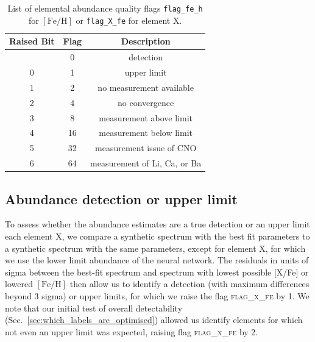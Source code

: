 \documentclass[
  journal=pasa,
  manuscript=research-paper, %
  year=2024,
  volume=37
]{cup-journal}
\newcommand{\feh}{$\mathrm{[Fe/H]}$\xspace}
\begin{document}
\begin{table}
\centering
\caption{List of elemental abundance quality flags \texttt{flag\_fe\_h} for \feh or \texttt{flag\_X\_fe} for element X.}
\label{tab:flag_x_fe}
\begin{tabular}{ccc}
\hline \hline
Raised Bit & Flag & Description \\
\hline
  & 0 & detection \\ 
0 & 1 & upper limit \\ 
1 & 2 & no measurement available\\
2 & 4 & no convergence\\
3 & 8 & measurement above limit\\
4 & 16 & measurement below limit\\
5 & 32 & measurement issue of CNO \\
6 & 64 & measurement of Li, Ca, or Ba \\ %
\hline
\end{tabular}
\end{table}

\subsection{Abundance detection or upper limit}
\label{sec:abundance_detection_or_upper_limit}

To assess whether the abundance estimates are a true detection or an upper limit each element X, we compare a synthetic spectrum with the best fit parameters to a synthetic spectrum with the same parameters, except for element X, for which we use the lower limit abundance of the neural network. The residuals in units of sigma between the best-fit spectrum and spectrum with lowest possible [X/Fe] or lowered \feh then allow us to identify a detection (with maximum differences beyond 3 sigma) or upper limits, for which we raise the flag \textsc{flag\_x\_fe} by 1. We note that our initial test of overall detectability (Sec.~\ref{sec:which_labels_are_optimised}) allowed us identify elements for which not even an upper limit was expected, raising flag \textsc{flag\_x\_fe} by 2.
\end{document}
